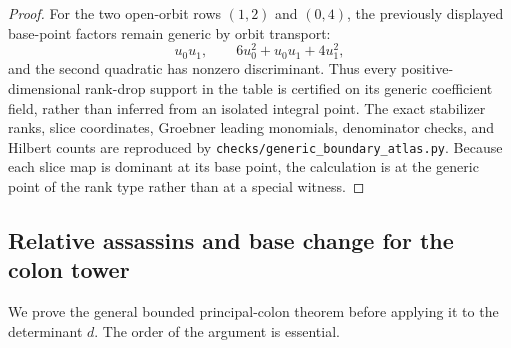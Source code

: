 \begin{proof}
For the two open-orbit rows \((1,2)\) and \((0,4)\), the previously
displayed base-point factors remain generic by orbit transport:
\[
 u_0u_1,\qquad 6u_0^2+u_0u_1+4u_1^2,
\]
and the second quadratic has nonzero discriminant.  Thus every
positive-dimensional rank-drop support in the table is certified on
its generic coefficient field, rather than inferred from an isolated
integral point.
The exact stabilizer ranks, slice coordinates, Groebner leading
monomials, denominator checks, and Hilbert counts are reproduced by
\texttt{checks/generic\_boundary\_atlas.py}.  Because each slice
map is dominant at its base point, the calculation is at the generic
point of the rank type rather than at a special witness.
\end{proof}

\subsection{Relative assassins and base change for the colon tower}

We prove the general bounded principal-colon theorem before applying it
to the determinant \(d\).  The order of the argument is essential.



